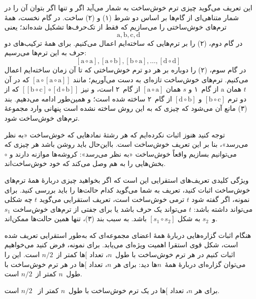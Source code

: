 \documentclass[../../../include/open-logic-section]{subfiles}
\begin{document}
این تعریف می‌گوید چیزی ترم خوش‌ساخت به شمار می‌آید اگر و تنها اگر
بتوان آن را در شمار متناهی‌ای از گام‌ها بر اساس دو شرط (۱) و (۲) ساخت.
در گام نخست، همهٔ ترم‌های خوش‌ساختی را می‌سازیم که فقط از تک‌حرف‌ها
تشکیل شده‌اند؛ یعنی
\[
\mathrm{a}, \mathrm{b}, \mathrm{c}, \mathrm{d}
\]
در گام دوم، (۲) را بر ترم‌هایی که ساخته‌ایم اعمال می‌کنیم. برای همهٔ
ترکیب‌های دو حرف به این ترم‌ها می‌رسیم:
\[
[\mathrm{a} \circ \mathrm{a}], [\mathrm{a} \circ \mathrm{b}],
[\mathrm{b} \circ \mathrm{a}], \dots, [\mathrm{d} \circ \mathrm{d}]
\]
در گام سوم، (۲) را دوباره بر هر دو ترم خوش‌ساختی که تا آن زمان
ساخته‌ایم اعمال می‌کنیم. ترم‌های خوش‌ساخت تازه‌ای به دست می‌آوریم؛
مانند $[\mathrm{a} \circ [\mathrm{a} \circ \mathrm{a}]]$ که در آن
$t$ همان $\mathrm{a}$ از گام~۱ و $s$ همان
$[\mathrm{a} \circ \mathrm{a}]$ از گام~۲ است، و نیز
$[[\mathrm{b} \circ \mathrm{c}] \circ [\mathrm{d} \circ \mathrm{b}]]$
که از دو ترم $[\mathrm{b} \circ \mathrm{c}]$ و
$[\mathrm{d} \circ \mathrm{b}]$ از گام~۲ ساخته شده است؛ و همین‌طور
ادامه می‌دهیم. بند (۳) مانع آن می‌شود که چیزی که به این روش ساخته نشده
است پنهانی وارد مجموعهٔ ترم‌های خوش‌ساخت شود.

توجه کنید هنوز اثبات نکرده‌ایم که هر رشتهٔ نمادهایی که خوش‌ساخت
«به نظر می‌رسد»، بنا بر این تعریف خوش‌ساخت است. بااین‌حال باید روشن
باشد هر چیزی که می‌توانیم بسازیم واقعاً خوش‌ساخت «به نظر می‌رسد»:
کروشه‌ها موازنه دارند و $\circ$ بخش‌هایی را به هم وصل می‌کند که خود
خوش‌ساخت‌اند.

ویژگی کلیدی تعریف‌های استقرایی این است که اگر بخواهید چیزی دربارهٔ
همهٔ ترم‌های خوش‌ساخت اثبات کنید، تعریف به شما می‌گوید کدام حالت‌ها را
باید بررسی کنید. برای نمونه، اگر گفته شود $t$ ترمی خوش‌ساخت است، تعریف
استقرایی می‌گوید $t$ چه شکلی می‌تواند داشته باشد: $t$ می‌تواند یک حرف
باشد یا برای جفتی از ترم‌های خوش‌ساخت $s_1$ و~$s_2$ به شکل
$[s_1 \circ s_2]$ باشد. به سبب بند (۳)، تنها همین حالت‌ها ممکن‌اند.

هنگام اثبات گزاره‌هایی دربارهٔ همهٔ اعضای مجموعه‌ای که به‌طور استقرایی
تعریف شده است، شکل قوی استقرا اهمیت ویژه‌ای می‌یابد. برای نمونه، فرض
کنید می‌خواهیم اثبات کنیم در هر ترم خوش‌ساخت با طول~$n$، تعداد $[$ها
کمتر از~$n/2$ است. این را می‌توان گزاره‌ای دربارهٔ همهٔ~$n$ها دید:
برای هر $n$، تعداد $[$ها در هر ترم خوش‌ساخت با طول~$n$ کمتر از~$n/2$
است.

\begin{prop}
  برای هر $n$، تعداد $[$ها در یک ترم خوش‌ساخت با طول~$n$ کمتر از
  ~$n/2$ است.
\end{prop}
\end{document}
